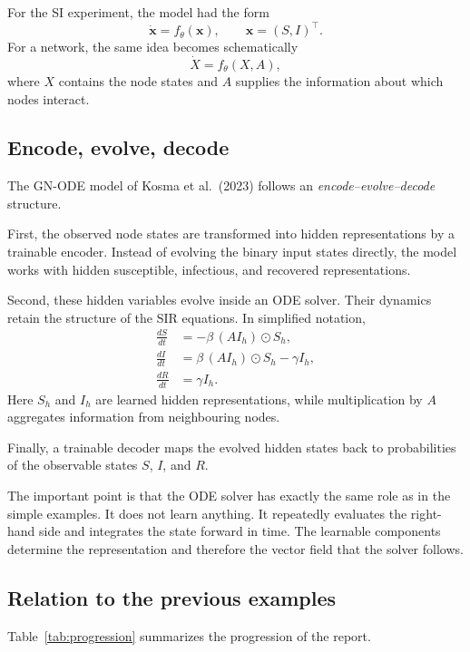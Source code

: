 \documentclass[11pt,a4paper]{article}
\begin{document}
For the SI experiment, the model had the form
\[
    \dot{\mathbf{x}}=f_\theta(\mathbf{x}),
    \qquad
    \mathbf{x}=(S,I)^\top.
\]
For a network, the same idea becomes schematically
\[
    \dot{X}=f_\theta(X,A),
\]
where $X$ contains the node states and $A$ supplies the information about which
nodes interact.


\subsection{Encode, evolve, decode}

The GN-ODE model of Kosma et al.\ (2023) follows an
\emph{encode--evolve--decode} structure.

First, the observed node states are transformed into hidden representations by
a trainable encoder. Instead of evolving the binary input states directly, the
model works with hidden susceptible, infectious, and recovered
representations.

Second, these hidden variables evolve inside an ODE solver. Their dynamics
retain the structure of the SIR equations. In simplified notation,
\begin{align}
    \frac{dS}{dt}
        &= -\beta\,(A I_h)\odot S_h,\\
    \frac{dI}{dt}
        &=  \beta\,(A I_h)\odot S_h-\gamma I_h,\\
    \frac{dR}{dt}
        &=  \gamma I_h.
    \label{eq:gnode-core}
\end{align}
Here $S_h$ and $I_h$ are learned hidden representations, while multiplication
by $A$ aggregates information from neighbouring nodes.

Finally, a trainable decoder maps the evolved hidden states back to
probabilities of the observable states $S$, $I$, and $R$.

The important point is that the ODE solver has exactly the same role as in the
simple examples. It does not learn anything. It repeatedly evaluates the
right-hand side and integrates the state forward in time. The learnable
components determine the representation and therefore the vector field that
the solver follows.


\subsection{Relation to the previous examples}

Table~\ref{tab:progression} summarizes the progression of the report.
\end{document}
